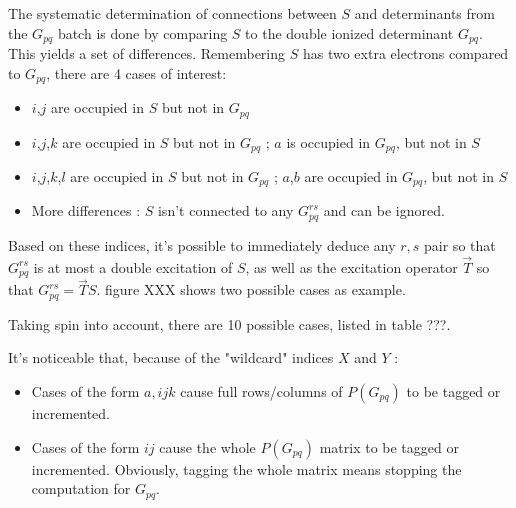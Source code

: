 \documentclass[./thesis.tex]{subfiles}
\begin{document}
The systematic determination of connections between $S$ and determinants from the $G_{pq}$ batch is done by comparing $S$ to the double ionized determinant $G_{pq}$. This yields a set of differences. Remembering $S$ has two extra electrons compared to $G_{pq}$, there are 4 cases of interest:
\begin{itemize}

\item
$i$,$j$ are occupied in $S$ but not in $G_{pq}$
\item
$i$,$j$,$k$ are occupied in $S$ but not in $G_{pq}$ ; $a$ is occupied in $G_{pq}$, but not in $S$
\item
$i$,$j$,$k$,$l$ are occupied in $S$ but not in $G_{pq}$ ; $a$,$b$ are occupied in $G_{pq}$, but not in $S$
\item
More differences : $S$ isn't connected to any $G_{pq}^{rs}$ and can be ignored. 

\end{itemize}

Based on these indices, it's possible to immediately deduce any $r,s$ pair so that $G_{pq}^{rs}$ is at most a double excitation of $S$, as well as the excitation operator $\overrightarrow{T}$ so that $G_{pq}^{rs}=\overrightarrow{T}S$. figure XXX shows two possible cases as example.

Taking spin into account, there are 10 possible cases, listed in table ???.


It's noticeable that, because of the "wildcard" indices $X$ and $Y$ :
\begin{itemize}

\item
Cases of the form $a,ijk$ cause full rows/columns of $P(G_{pq})$ to be tagged or incremented.
\item
Cases of the form $ij$ cause the whole $P(G_{pq})$ matrix to be tagged or incremented. Obviously, tagging the whole matrix means stopping the computation for $G_{pq}$.
\end{itemize}
\end{document}
